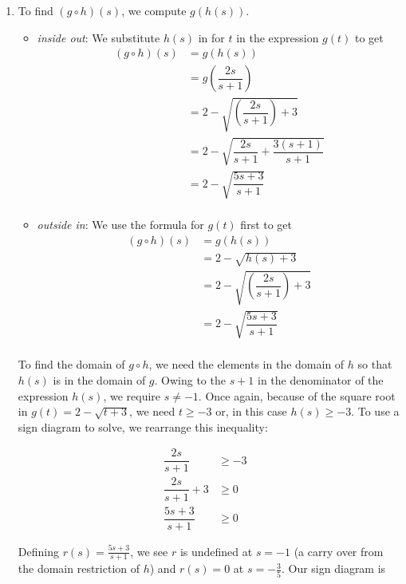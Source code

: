 \begin{ex}
\begin{enumerate}
\item  To find $(g \circ h)(s)$, we compute $g(h(s))$. 

\begin{itemize}

\item  \textit{inside out}: We substitute $h(s)$ in for $t$ in the expression $g(t)$  to get 
\begin{align*}
	(g \circ h)(s) & = g(h(s))\\
	&= g\left(\dfrac{2s}{s+1}\right) \\
 	& = 2 - \sqrt{\left(\dfrac{2s}{s+1}\right)+3} \\
	& = 2 - \sqrt{\dfrac{2s}{s+1} + \dfrac{3(s+1)}{s+1}} \tag{get common denominators}\\
 	& = 2 - \sqrt{\dfrac{5s+3}{s+1}} \\
\end{align*}

\item  \textit{outside in}:  We use the formula for $g(t)$ first to get
\begin{align*}
	(g \circ h)(s) & = g(h(s)) \\
	&= 2 - \sqrt{h(s)+3} \\
  	&= 2 - \sqrt{\left(\dfrac{2s}{s+1}\right)+3} \\
	&= 2 - \sqrt{\dfrac{5s+3}{s+1}} \tag{get common denominators as before}\\
\end{align*}

\end{itemize}

To find the domain of $g \circ h$, we need the elements in the domain of $h$ so that $h(s)$ is in the domain of $g$.  Owing to the $s+1$ in the denominator of the expression  $h(s)$, we require $s \neq -1$.  Once again, because  of the square root in $g(t) = 2 - \sqrt{t+3}$, we need $t \geq -3$ or, in this case $h(s)  \geq -3$.  To use a sign diagram to solve, we rearrange this inequality:

\begin{align*}
\dfrac{2s}{s+1} & \geq -3 & \\
\dfrac{2s}{s+1} +3 & \geq 0 \\
\dfrac{5s+3}{s+1} & \geq 0 \tag{get common denominators as before}
\end{align*}

Defining $r(s) = \frac{5s+3}{s+1}$, we see $r$ is undefined at $s=-1$ (a carry over from the domain restriction of $h$) and $r(s) = 0$ at $s = -\frac{3}{5}$. Our sign diagram is


\end{enumerate}
\end{ex}
